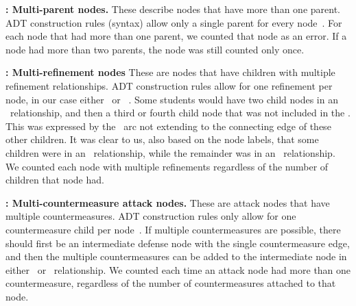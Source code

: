 \textbf{\hypothesis{\hypoMultipleParent}: Multi-parent nodes.} These describe nodes that have more than one parent. ADT construction rules (syntax) allow only a single parent for every node~\cite{kordyFoundationsAttackDefense2011}. For each node that had more than one parent, we counted that node as an error. If a node had more than two parents, the node was still counted only once.

\textbf{\hypothesis{\hypoMultipleRefinement}: Multi-refinement nodes} These are nodes that have children with multiple refinement relationships. ADT construction rules allow for one refinement per node, in our case either \AND\ or \OR~\cite{kordyFoundationsAttackDefense2011}. Some students would have two child nodes in an \AND\ relationship, and then a third or fourth child node that was not included in the \AND. This was expressed by the \AND\ arc not extending to the connecting edge of these other children. It was clear to us, also based on the node labels, that some children were in an \AND\ relationship, while the remainder was in an \OR\ relationship. We counted each node with multiple refinements regardless of the number of children that node had.

\textbf{\hypothesis{\hypoMulipleCountermeasure}: Multi-countermeasure attack nodes.} These are attack nodes that have multiple countermeasures. ADT construction rules only allow for one countermeasure child per node~\cite{kordyFoundationsAttackDefense2011}. If multiple countermeasures are possible, there should first be an intermediate defense node with the single countermeasure edge, and then the multiple countermeasures can be added to the intermediate node in either \AND\ or \OR\ relationship. We counted each time an attack node had more than one countermeasure, regardless of the number of countermeasures attached to that node. %

